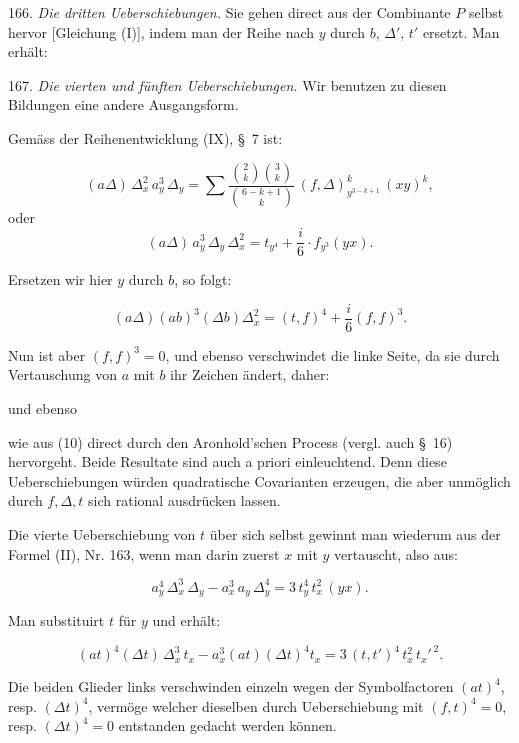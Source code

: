 
166. \textit{Die dritten Ueberschiebungen.} Sie gehen direct aus der Combinante $P$ selbst hervor [Gleichung (I)], indem man der Reihe nach $y$ durch $b$, $\Delta'$, $t'$ ersetzt. Man erhält:






167. \textit{Die vierten und fünften Ueberschiebungen.} Wir benutzen zu diesen Bildungen eine andere Ausgangsform.

Gemäss der Reihenentwicklung (IX), \S~7 ist:

\[
(a\Delta)\,\Delta_x^2\,a_y^3\,\Delta_y = \sum \frac{\binom{2}{k}\binom{3}{k}}{\binom{6-k+1}{k}}\,(f,\Delta)^k_{y^{3-k+1}}\,(xy)^k,
\]
oder
\[
(a\Delta)\,a_y^3\,\Delta_y\,\Delta_x^2 = t_{y^4} + \frac{i}{6}\cdot f_{y^3}(yx).
\]

Ersetzen wir hier $y$ durch $b$, so folgt:

\[
(a\Delta)(ab)^3(\Delta b)\Delta_x^2 = (t,f)^4 + \frac{i}{6}(f,f)^3.
\]

Nun ist aber $(f,f)^3=0$, und ebenso verschwindet die linke Seite, da sie durch Vertauschung von $a$ mit $b$ ihr Zeichen ändert, daher:

und ebenso

wie aus (10) direct durch den Aronhold'schen Process (vergl. auch \S~16) hervorgeht. Beide Resultate sind auch a priori einleuchtend. Denn diese Ueberschiebungen würden quadratische Covarianten erzeugen, die aber unmöglich durch $f, \Delta, t$ sich rational ausdrücken lassen.

Die vierte Ueberschiebung von $t$ über sich selbst gewinnt man wiederum aus der Formel (II), Nr. 163, wenn man darin zuerst $x$ mit $y$ vertauscht, also aus:

\[
a_y^4\,\Delta_x^3\,\Delta_y - a_x^3\,a_y\,\Delta_y^4 = 3\,t_y^4\,t_x^2\,(yx).
\]

Man substituirt $t$ für $y$ und erhält:

\[
(at)^4(\Delta t)\,\Delta_x^3\,t_x - a_x^3(at)(\Delta t)^4 t_x = 3\,(t,t')^4\,t_x^2\,t_x'^{\,2}.
\]

Die beiden Glieder links verschwinden einzeln wegen der Symbolfactoren $(at)^4$, resp. $(\Delta t)^4$, vermöge welcher dieselben durch Ueberschiebung mit $(f,t)^4=0$, resp. $(\Delta t)^4=0$ entstanden gedacht werden können.


